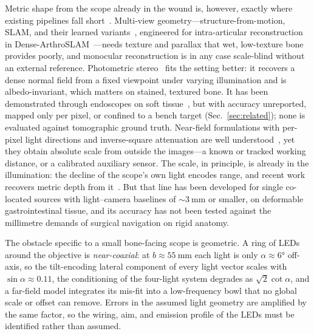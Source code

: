 \documentclass[conference]{IEEEtran}
\begin{document}
Metric shape from the scope already in the wound is, however, exactly
where existing pipelines fall short~\cite{maierhein2013optical}.
Multi-view geometry---structure-from-motion, SLAM, and their learned
variants~\cite{ozyoruk2021endoslam}, engineered for intra-articular
reconstruction in Dense-ArthroSLAM~\cite{marmol2019densearthroslam}---needs texture and
parallax that wet, low-texture bone provides poorly, and monocular
reconstruction is in any case scale-blind without an external
reference.  Photometric
stereo~\cite{woodham1980} fits the setting better: it recovers a dense
normal field from a fixed viewpoint under varying illumination and is
albedo-invariant, which matters on stained, textured bone.  It has been
demonstrated through endoscopes on soft
tissue~\cite{parot2013photometric,collins2012close,hao2020capsule}, but with
accuracy unreported, mapped only per pixel, or confined to a bench
target (Sec.~\ref{sec:related}); none is evaluated against tomographic
ground truth.
Near-field formulations with per-pixel light directions and inverse-square
attenuation are well
understood~\cite{queau2018led,batlle2022photometric,mecca2014near}, yet
they obtain absolute scale from outside the images---a known or tracked
working distance, or a calibrated auxiliary sensor.  The scale, in
principle, is already in the illumination: the decline of the scope's own
light encodes range, and recent work recovers metric depth from
it~\cite{rodriguezpuigvert2023lightdepth,batlle2023lightneus,iranzo2025endometric}.
But that line has been developed for single co-located sources with
light--camera baselines of ${\sim}\SI{3}{\milli\meter}$ or smaller, on
deformable gastrointestinal tissue, and its accuracy has not been tested against the
millimetre demands of surgical navigation on rigid anatomy.

The obstacle specific to a small bone-facing scope is geometric.  A ring
of LEDs around the objective is \emph{near-coaxial}: at
$b\approx\SI{55}{\milli\meter}$ each light is only $\alpha\approx\ang{6}$
off-axis, so the tilt-encoding lateral component of every light vector
scales with $\sin\alpha\approx0.11$, the conditioning of the four-light
system degrades as $\sqrt{2}\cot\alpha$, and a far-field model integrates
its mis-fit into a low-frequency bowl that no global scale or offset can
remove.  Errors in the assumed light geometry are amplified by the same
factor, so the wiring, aim, and emission profile of the LEDs must be
identified rather than assumed.
\end{document}
